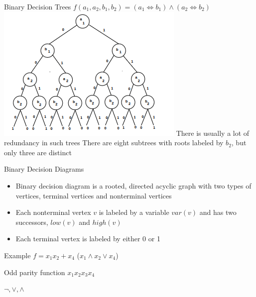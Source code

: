 \documentclass{beamer}
\begin{document}
\begin{frame}{Binary Decision Trees}
$f(a_1, a_2, b_1, b_2) = (a_1 \iff b_1) \wedge (a_2 \iff b_2)$
\includegraphics[scale=0.5]{decision_tree.png}\newline
There is usually a lot of redundancy in such trees\newline
There are eight subtrees with roots labeled by $b_2$, but only three are distinct\newline
\end{frame}

\begin{frame}{Binary Decision Diagrams}
\begin{itemize}
\item Binary decision diagram is a rooted, directed acyclic graph with two types of vertices, terminal vertices and nonterminal vertices
\item Each nonterminal vertex $v$ is labeled by a variable $var(v)$ and has two successors, $low(v)$ and $high(v)$
\item Each terminal vertex is labeled by either 0 or 1
\end{itemize}
\end{frame}

\begin{frame}{Example}
$f = x_1 x_2 + x_4$\newline
($x_1 \wedge x_2 \vee x_4$)
\end{frame}

\begin{frame}{Odd parity function}
$x_1 x_2 x_3 x_4$
\end{frame}

\begin{frame}{$\lnot, \vee, \wedge$}
\end{frame}
\end{document}
